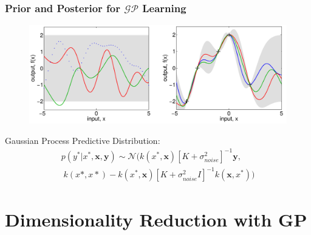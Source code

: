 \documentclass[10pt]{beamer}
\newcommand{\bx}{\mathbf{x}}
\newcommand{\by}{\mathbf{y}}
\newcommand{\gp}{\mathcal{GP}}
\newcommand{\gaussN}{\mathcal{N}}
\begin{document}
  \begin{frame}
    \frametitle{Prior and Posterior for $\gp$ Learning}

    \begin{figure}
      \centering
      \includegraphics[width=\textwidth]{gpRegression.png}
    \end{figure}

    Gaussian Process Predictive Distribution:
      \begin{equation*}
        \begin{array}{c}
          p(y^*|x^*,\bx,\by) \sim \gaussN ( k(x^*,\bx)[K + \sigma^2_{noise}]^{-1}\by, \\[0.2cm]
          \; k(x*,x*) - k(x^*,\bx)[K + \sigma^2_{noise}I]^{-1} k(\bx,x^*) )
        \end{array}
      \end{equation*}
  \end{frame}

  \section{Dimensionality Reduction with GP}
\end{document}
